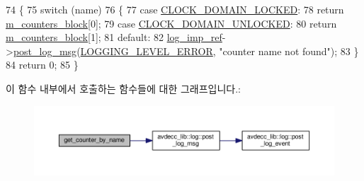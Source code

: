 \begin{DoxyCode}
74 \{
75     \textcolor{keywordflow}{switch} (name)
76     \{
77     \textcolor{keywordflow}{case} \hyperlink{namespaceavdecc__lib_a831be56dba8ac423258a9374a1202df4a956e33777cd5b1499e9c1e3aba85afbd}{CLOCK\_DOMAIN\_LOCKED}:
78         \textcolor{keywordflow}{return} \hyperlink{classavdecc__lib_1_1clock__domain__counters__response__imp_a4280ad18b84e17884a0eca22237e22a9}{m\_counters\_block}[0];
79     \textcolor{keywordflow}{case} \hyperlink{namespaceavdecc__lib_a831be56dba8ac423258a9374a1202df4ab363d627741d74c605ed201dd91ce78e}{CLOCK\_DOMAIN\_UNLOCKED}:
80         \textcolor{keywordflow}{return} \hyperlink{classavdecc__lib_1_1clock__domain__counters__response__imp_a4280ad18b84e17884a0eca22237e22a9}{m\_counters\_block}[1];
81     \textcolor{keywordflow}{default}:
82         \hyperlink{namespaceavdecc__lib_acbe3e2a96ae6524943ca532c87a28529}{log\_imp\_ref}->\hyperlink{classavdecc__lib_1_1log_a68139a6297697e4ccebf36ccfd02e44a}{post\_log\_msg}(\hyperlink{namespaceavdecc__lib_a501055c431e6872ef46f252ad13f85cdaf2c4481208273451a6f5c7bb9770ec8a}{LOGGING\_LEVEL\_ERROR}, \textcolor{stringliteral}{"counter
       name not found"});
83     \}
84     \textcolor{keywordflow}{return} 0;
85 \}
\end{DoxyCode}


이 함수 내부에서 호출하는 함수들에 대한 그래프입니다.\+:
\nopagebreak
\begin{figure}[H]
\begin{center}
\leavevmode
\includegraphics[width=350pt]{classavdecc__lib_1_1clock__domain__counters__response__imp_a5746c406e06afbbd5f35819f8e378476_cgraph}
\end{center}
\end{figure}


